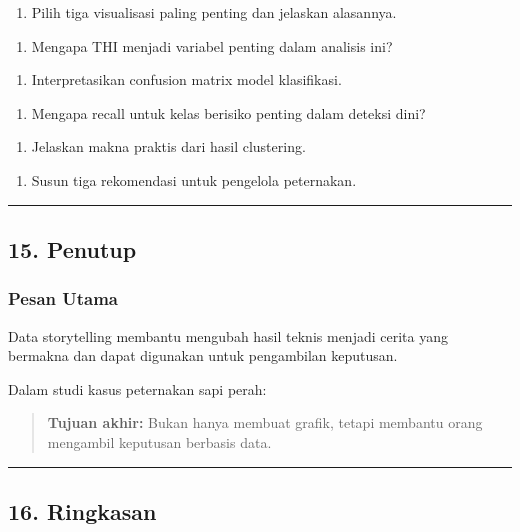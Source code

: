 \documentclass[12pt,a4paper]{article}
\begin{document}
\begin{enumerate}
\item Pilih tiga visualisasi paling penting dan jelaskan alasannya.
\end{enumerate}

\begin{enumerate}
\item Mengapa THI menjadi variabel penting dalam analisis ini?
\end{enumerate}

\begin{enumerate}
\item Interpretasikan confusion matrix model klasifikasi.
\end{enumerate}

\begin{enumerate}
\item Mengapa recall untuk kelas berisiko penting dalam deteksi dini?
\end{enumerate}

\begin{enumerate}
\item Jelaskan makna praktis dari hasil clustering.
\end{enumerate}

\begin{enumerate}
\item Susun tiga rekomendasi untuk pengelola peternakan.
\end{enumerate}


\hrule


\subsection{15. Penutup}

\subsubsection{Pesan Utama}

Data storytelling membantu mengubah hasil teknis menjadi cerita yang bermakna dan dapat digunakan untuk pengambilan keputusan.


Dalam studi kasus peternakan sapi perah:


\begin{quote}
\textbf{Tujuan akhir:} Bukan hanya membuat grafik, tetapi membantu orang mengambil keputusan berbasis data.\end{quote}


\hrule


\subsection{16. Ringkasan}
\end{document}
